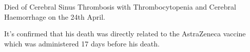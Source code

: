 Died of Cerebral Sinus Thrombosis with Thrombocytopenia and Cerebral Haemorrhage
on the 24th April.

It’s confirmed that his death was directly related to the AstraZeneca vaccine
which was administered 17 days before his death.

